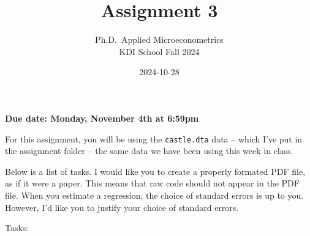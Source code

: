 \documentclass[
]{article}
\title{Assignment 3}
\subtitle{Ph.D.~Applied Microeconometrics\\
KDI School Fall 2024}
\author{}
\date{\vspace{-2.5em}2024-10-28}
\begin{document}
\maketitle

\textbf{Due date: Monday, November 4th at 6:59pm}

For this assignment, you will be using the \texttt{castle.dta} data -- which I've put in the assignment folder -- the same data we have been using this week in class.

Below is a list of tasks. I would like you to create a properly formated PDF file, as if it were a paper. This means that raw code should not appear in the PDF file. When you estimate a regression, the choice of standard errors is up to you. However, I'd like you to justify your choice of standard errors.

Tasks:
\end{document}
